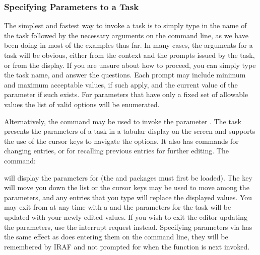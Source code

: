 \begin{quotation}\noindent
{} 
\end{quotation}

\subsubsection{Specifying Parameters to a Task}

\ppind
The simplest and fastest way to invoke a task is to simply type in the name
of the task followed by the necessary arguments on the command line, as we
have been doing in most of the examples thus far.
In many cases, the arguments for a task will be obvious, either from the context
and the prompts issued by the task, or from the  display.
If you are unsure about how to proceed,
you can simply type the task name, and answer the questions.
Each prompt may include minimum and maximum acceptable values,
if such apply, and the current value of the parameter if such exists. 
For parameters that have only a fixed set of allowable values the list of
valid options will be enumerated.

Alternatively, the  command may be used to invoke the
parameter .  The  task presents the
parameters of a task in a tabular display on the screen and supports the
use of the cursor keys to navigate the options.  It also has commands for
changing entries, or for recalling previous entries for further editing.
The command:

\begin{quotation}\noindent
{} 
\end{quotation}

\noindent
will display the parameters for  (the  and
 packages must first be loaded).  The 
key will move you down the list or the cursor keys
may be used to move among the parameters, and any entries that you
type will replace the displayed values.  You may exit from
 at any time with a  and the parameters 
for the task will be updated with your newly edited values.
If you wish to exit the editor  updating the
parameters, use the interrupt request  instead.
Specifying parameters via  has the same effect as
does entering them on the command line, they will be remembered by IRAF
and not prompted for when the function is next invoked.  

